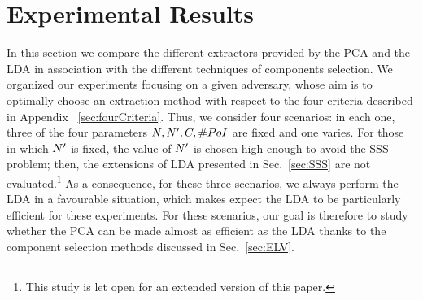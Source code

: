 \section{Experimental Results}\label{sec:experiments}

In this section we compare the different extractors provided by the PCA and the LDA in association with the different techniques  of components selection. We organized our experiments focusing on a given adversary, whose aim is to optimally choose an extraction method with respect to the four criteria described in Appendix ~\ref{sec:fourCriteria}. Thus, we consider four scenarios: in each one, three of the four parameters $\numTraces[], \numTraces[]', \newTraceLength, \numPoI$ are fixed and one varies. For those in which $\numTraces[]'$ is fixed, the value of $\numTraces[]'$ is chosen high enough to avoid the SSS problem; then, the extensions of LDA presented in Sec.~\ref{sec:SSS} are not evaluated.\footnote{This study is let open for an extended version of this paper.} As a consequence, for these three scenarios, we always perform the LDA in a favourable situation, which makes expect the LDA to be particularly efficient for these experiments. For these scenarios, our goal is therefore to study whether the PCA can be made almost as efficient as the LDA thanks to the component selection methods discussed in Sec.~\ref{sec:ELV}. 



